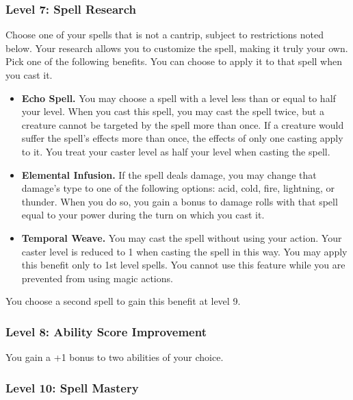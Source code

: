 \documentclass[12pt,letterpaper,twocolumn,openany,nodeprecatedcode,bg=none]{dndbook}
\providecommand{\tightlist}{%
  \setlength{\itemsep}{0pt}\setlength{\parskip}{0pt}}
\begin{document}
\subsubsection{Level 7: Spell Research}\label{level-7-spell-research}

Choose one of your spells that is not a cantrip, subject to restrictions
noted below. Your research allows you to customize the spell, making it
truly your own. Pick one of the following benefits. You can choose to
apply it to that spell when you cast it.

\begin{itemize}
\tightlist
\item
  \textbf{Echo Spell.} You may choose a spell with a level less than or
  equal to half your level. When you cast this spell, you may cast the
  spell twice, but a creature cannot be targeted by the spell more than
  once. If a creature would suffer the spell's effects more than once,
  the effects of only one casting apply to it. You treat your caster
  level as half your level when casting the spell.
\item
  \textbf{Elemental Infusion.} If the spell deals damage, you may change
  that damage's type to one of the following options: acid, cold, fire,
  lightning, or thunder. When you do so, you gain a bonus to damage
  rolls with that spell equal to your power during the turn on which you
  cast it.
\item
  \textbf{Temporal Weave.} You may cast the spell without using your
  action. Your caster level is reduced to 1 when casting the spell in
  this way. You may apply this benefit only to 1st level spells. You
  cannot use this feature while you are prevented from using magic
  actions.
\end{itemize}

You choose a second spell to gain this benefit at level 9.

\subsubsection{Level 8: Ability Score
Improvement}\label{level-8-ability-score-improvement}

You gain a +1 bonus to two abilities of your choice.

\subsubsection{Level 10: Spell Mastery}\label{level-10-spell-mastery}
\end{document}
